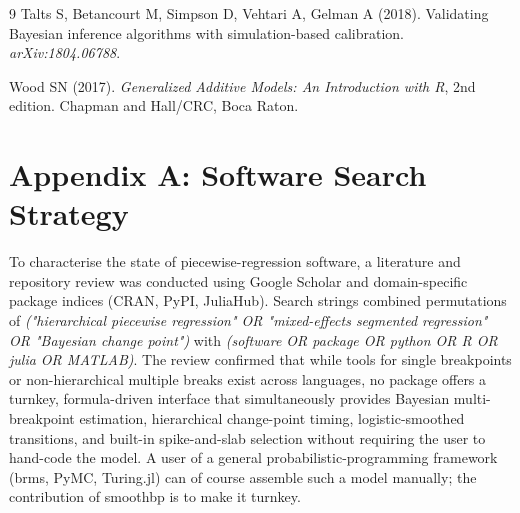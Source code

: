 \documentclass[12pt]{article}
\newcommand{\pkg}[1]{\textsf{#1}}
\begin{document}
\begin{thebibliography}{9}
Talts S, Betancourt M, Simpson D, Vehtari A, Gelman A (2018).
\newblock Validating Bayesian inference algorithms with simulation-based calibration.
\newblock \textit{arXiv:1804.06788}.

Wood SN (2017).
\newblock \textit{Generalized Additive Models: An Introduction with R}, 2nd edition.
\newblock Chapman and Hall/CRC, Boca Raton.

\end{thebibliography}

\section*{Appendix A: Software Search Strategy}
To characterise the state of piecewise-regression software, a literature and repository review was conducted using Google Scholar and domain-specific package indices (CRAN, PyPI, JuliaHub). Search strings combined permutations of \textit{("hierarchical piecewise regression" OR "mixed-effects segmented regression" OR "Bayesian change point")} with \textit{(software OR package OR python OR R OR julia OR MATLAB)}. The review confirmed that while tools for single breakpoints or non-hierarchical multiple breaks exist across languages, no package offers a turnkey, formula-driven interface that simultaneously provides Bayesian multi-breakpoint estimation, hierarchical change-point timing, logistic-smoothed transitions, and built-in spike-and-slab selection without requiring the user to hand-code the model. A user of a general probabilistic-programming framework (\pkg{brms}, \pkg{PyMC}, \pkg{Turing.jl}) can of course assemble such a model manually; the contribution of \pkg{smoothbp} is to make it turnkey.
\end{document}
